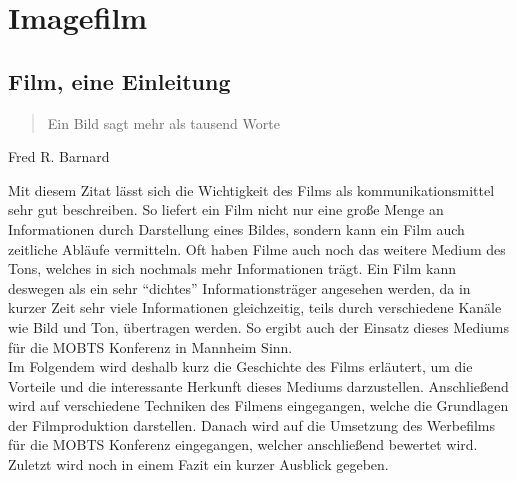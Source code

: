 \chapter{Imagefilm}
\section{Film, eine Einleitung}
\begin{quote}
    Ein Bild sagt mehr als tausend Worte
\end{quote}
\begin{flushright}
    Fred R. Barnard
\end{flushright}
Mit diesem Zitat lässt sich die Wichtigkeit des Films als kommunikationsmittel sehr gut beschreiben. So liefert ein Film nicht nur eine große Menge an Informationen durch Darstellung eines Bildes, sondern kann ein Film auch zeitliche Abläufe vermitteln. Oft haben Filme auch noch das weitere Medium des Tons, welches in sich nochmals mehr Informationen trägt. Ein Film kann deswegen als ein sehr \enquote{dichtes} Informationsträger angesehen werden, da in kurzer Zeit sehr viele Informationen gleichzeitig, teils durch verschiedene Kanäle wie Bild und Ton, übertragen werden. So ergibt auch der Einsatz dieses Mediums für die \ac{MOBTS} Konferenz in Mannheim Sinn.\\

Im Folgendem wird deshalb kurz die Geschichte des Films erläutert, um die Vorteile und die interessante Herkunft dieses Mediums darzustellen. Anschließend wird auf verschiedene Techniken des Filmens eingegangen, welche die Grundlagen der Filmproduktion darstellen. Danach wird auf die Umsetzung des Werbefilms für die \ac{MOBTS} Konferenz eingegangen, welcher anschließend bewertet wird. Zuletzt wird noch in einem Fazit ein kurzer Ausblick gegeben.
